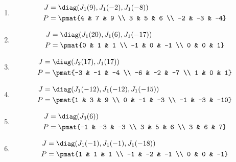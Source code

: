 \begin{enumerate}
\item

\begin{align*}
J &= \diag(J_{1}(9), J_{1}(-2), J_{1}(-8))\\
P &= \pmat{4 & 7 & 9 \\ 3 & 5 & 6 \\ -2 & -3 & -4}
\end{align*}

\item

\begin{align*}
J &= \diag(J_{1}(20), J_{1}(6), J_{1}(-17))\\
P &= \pmat{0 & 1 & 1 \\ -1 & 0 & -1 \\ 0 & 0 & 1}
\end{align*}

\item

\begin{align*}
J &= \diag(J_{2}(17), J_{1}(17))\\
P &= \pmat{-3 & -1 & -4 \\ -6 & -2 & -7 \\ 1 & 0 & 1}
\end{align*}

\item

\begin{align*}
J &= \diag(J_{1}(-12), J_{1}(-12), J_{1}(-15))\\
P &= \pmat{1 & 3 & 9 \\ 0 & -1 & -3 \\ -1 & -3 & -10}
\end{align*}

\item

\begin{align*}
J &= \diag(J_{3}(6))\\
P &= \pmat{-1 & -3 & -3 \\ 3 & 5 & 6 \\ 3 & 6 & 7}
\end{align*}

\item

\begin{align*}
J &= \diag(J_{1}(-1), J_{1}(-1), J_{1}(-18))\\
P &= \pmat{1 & 1 & 1 \\ -1 & -2 & -1 \\ 0 & 0 & -1}
\end{align*}


\end{enumerate}
